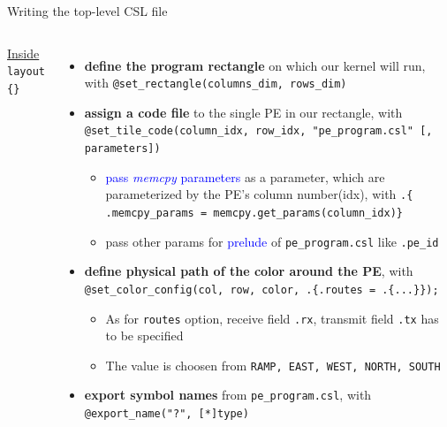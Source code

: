 \documentclass[dvipdfmx, 11pt, aspectratio=169]{beamer}   %
\begin{document}
\begin{frame}[fragile]{Writing the top-level CSL file}
\begin{columns}
\vspace{0.3\baselineskip}
\uline{Inside} \lstinline|layout {}|
\begin{itemize}
    \item \textbf{define the program rectangle} on which our kernel will run, with \lstinline|@set_rectangle(columns_dim, rows_dim)|
    \item \textbf{assign a code file} to the single PE in our rectangle, with \lstinline|@set_tile_code(column_idx, row_idx, "pe_program.csl" [, parameters])|
    \begin{itemize}
        \item \textcolor{blue}{pass \textit{memcpy} parameters} as a parameter, which are parameterized by the PE's column number(idx), with \lstinline|.{ .memcpy_params = memcpy.get_params(column_idx)}|
        \item pass other params for \textcolor{blue}{prelude} of \lstinline|pe_program.csl| like \lstinline|.pe_id|
    \end{itemize}
    \item \textbf{define physical path of the color around the PE}, with \lstinline|@set_color_config(col, row, color, .{.routes = .{...}});|
    \begin{itemize}
        \item As for \lstinline|routes| option, receive field \lstinline|.rx|, transmit field \lstinline|.tx| has to be specified
        \item The value is choosen from \lstinline|RAMP, EAST, WEST, NORTH, SOUTH|
    \end{itemize}
    \item \textbf{export symbol names} from \lstinline|pe_program.csl|, with \lstinline|@export_name("?", [*]type)| 
\end{itemize}
\end{columns}
\end{frame}
\end{document}
